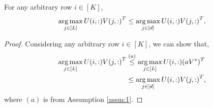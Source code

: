 \documentclass[twoside]{article}
\begin{document}
\begin{lemma}
For any arbitrary row $i\in[K]$, 
\begin{align*}
\mathop{\rm arg\,max}_{j\in[L]} U(i,:){V(j,:)}^T \leq \mathop{\rm arg\,max}_{j\in[d]} U(i,:){V(j,:)}^T . 
\end{align*}
\end{lemma}

\begin{proof}
Considering any arbitrary row $i\in [K]$, we can show that,
\begin{align*}
\mathop{\rm arg\,max}_{j\in[L]} U(i,:){V(j,:)}^T & \overset{(a)}{\leq} \mathop{\rm arg\,max}_{j\in[L]} U(i,:)(aV^*)^T \\
& \leq \mathop{\rm arg\,max}_{j\in[d]}U(i,:){V(j,:)}^T ,
\end{align*}
where $(a)$ is from Assumption \ref{assm:1}.
\end{proof}



%


\end{document}
